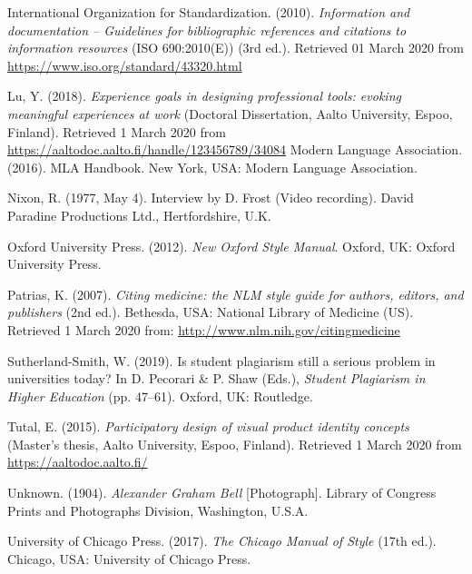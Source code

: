 \documentclass[finnish, 12pt, a4paper, elec, utf8, a-2b, online]{aaltothesis}
\begin{document}
\vspace{1ex}
\noindent
International Organization for Standardization. (2010). 
\textit{Information and documentation -- Guidelines for bibliographic references
	and citations to information resources} 
(ISO 690:2010(E)) (3rd ed.). Retrieved 01 March 2020 from 
\url{https://www.iso.org/standard/43320.html}

\vspace{1ex}
\noindent
Lu, Y. (2018). 
\textit{Experience goals in designing professional tools: evoking meaningful 
	experiences at work} 
(Doctoral Dissertation, Aalto University, Espoo, Finland). 
Retrieved 1 March 2020 from 
\url{https://aaltodoc.aalto.fi/handle/123456789/34084} 
Modern Language Association. (2016). MLA Handbook. New York, USA: Modern 
Language Association.

\vspace{1ex}
\noindent
Nixon, R. (1977, May 4). Interview by D. Frost (Video recording). 
David Paradine Productions Ltd., Hertfordshire, U.K.

\vspace{1ex}
\noindent
Oxford University Press. (2012). 
\textit{New Oxford Style Manual}. Oxford, UK: Oxford University Press.

\vspace{1ex}
\noindent
Patrias, K. (2007). 
\textit{Citing medicine: the NLM style guide for authors, editors, and 
	publishers} 
(2nd ed.). Bethesda, USA: National Library of Medicine (US). 
Retrieved 1 March 2020 from: \url{http://www.nlm.nih.gov/citingmedicine}

\vspace{1ex}
\noindent
Sutherland-Smith, W. (2019). Is student plagiarism still a serious problem in 
universities today? In D. Pecorari \& P. Shaw (Eds.), 
\textit{Student Plagiarism in Higher Education} (pp. 47--61). 
Oxford, UK: Routledge.

\vspace{1ex}
\noindent
Tutal, E. (2015). 
\textit{Participatory design of visual product identity concepts} 
(Master’s thesis, Aalto University, Espoo, Finland). 
Retrieved 1 March 2020 from \url{https://aaltodoc.aalto.fi/}

\vspace{1ex}
\noindent
Unknown. (1904). \textit{Alexander Graham Bell} [Photograph]. 
Library of Congress Prints and Photographs Division, Washington, U.S.A.

\vspace{1ex}
\noindent
University of Chicago Press. (2017). \textit{The Chicago Manual of Style} 
(17th ed.). Chicago, USA: University of Chicago Press.
\end{document}
